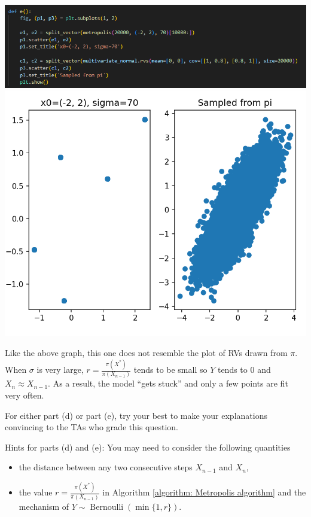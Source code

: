 \documentclass[11pt,letterpaper, leqno]{article}
\numberwithin{equation}{section}
\numberwithin{theorem}{section}
\numberwithin{lemma}{section}
\numberwithin{corollary}{section}
\numberwithin{definition}{section}
\numberwithin{proposition}{section}
\numberwithin{remark}{section}
\numberwithin{example}{section}
\begin{document}
\begin{enumerate}
\begin{enumerate}
        \color{blue}
            \includegraphics[width=\textwidth]{Images/2. E code.png}
            \includegraphics{Images/2. E.png}

            Like the above graph, this one does not resemble the plot of RVs drawn from $\pi$. When $\sigma$ is very large, $r = \frac{\pi(X^*)}{\pi(X_{n-1})}$ tends to be small so $Y$ tends to $0$ and $X_n \approx X_{n-1}$. As a result, the model ``gets stuck'' and only a few points are fit very often.
        \color{black}
\end{enumerate}

For either part (d) or part (e), try your best to make your explanations convincing to the TAs who grade this question.

Hints for parts (d) and (e): You may need to consider the following quantities
\begin{itemize}
    \item the distance between any two consecutive steps $X_{n-1}$ and $X_n$,
    \item the value $r  = \frac{\pi(X^*)}{\pi(X_{n-1})}$ in Algorithm \ref{algorithm: Metropolis algorithm} and the mechanism of $Y\sim \operatorname{Bernoulli}(\min\{1,r\})$.
\end{itemize}


\end{enumerate}


%

\end{document}

